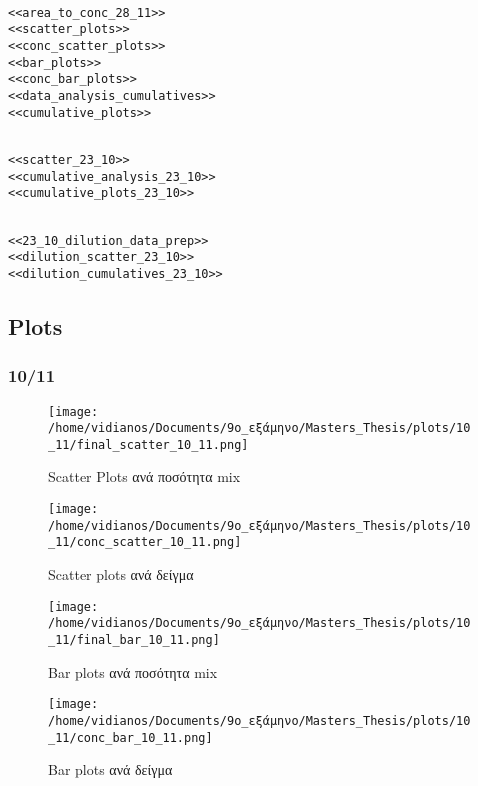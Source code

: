 \documentclass[11pt]{article}
\begin{document}
\begin{verbatim}

<<area_to_conc_28_11>>
<<scatter_plots>>
<<conc_scatter_plots>>
<<bar_plots>>
<<conc_bar_plots>>
<<data_analysis_cumulatives>>
<<cumulative_plots>>

\end{verbatim}

\begin{verbatim}

<<scatter_23_10>>
<<cumulative_analysis_23_10>>
<<cumulative_plots_23_10>>

\end{verbatim}

\begin{verbatim}

<<23_10_dilution_data_prep>>
<<dilution_scatter_23_10>>
<<dilution_cumulatives_23_10>>

\end{verbatim}

\subsection{Plots}
\label{sec:org623cae9}
\subsubsection{10/11}
\label{sec:org7018ae2}

\begin{figure}[htbp]
\centering
\texttt{[image: /home/vidianos/Documents/9o\_εξάμηνο/Masters\_Thesis/plots/10\_11/final\_scatter\_10\_11.png]}
\caption{Scatter Plots ανά ποσότητα mix}
\end{figure}

\begin{figure}[htbp]
\centering
\texttt{[image: /home/vidianos/Documents/9o\_εξάμηνο/Masters\_Thesis/plots/10\_11/conc\_scatter\_10\_11.png]}
\caption{Scatter plots ανά δείγμα}
\end{figure}

\begin{figure}[htbp]
\centering
\texttt{[image: /home/vidianos/Documents/9o\_εξάμηνο/Masters\_Thesis/plots/10\_11/final\_bar\_10\_11.png]}
\caption{Bar plots ανά ποσότητα mix}
\end{figure}

\begin{figure}[htbp]
\centering
\texttt{[image: /home/vidianos/Documents/9o\_εξάμηνο/Masters\_Thesis/plots/10\_11/conc\_bar\_10\_11.png]}
\caption{Bar plots ανά δείγμα}
\end{figure}
\end{document}
